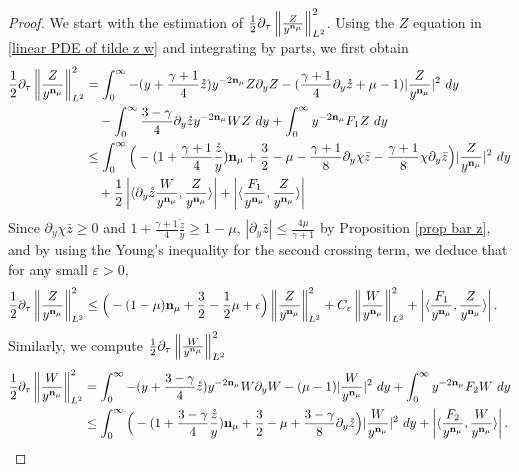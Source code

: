 \documentclass{article}
\newcommand{\norm}[1]{\left\lVert#1\right\rVert}
\newcommand{\ga}{\gamma}
\newcommand{\pa}{\partial}
\newcommand\eps{\varepsilon}
\def\espz{Z}
\def\espw{W}
\def\ndmu{{\bf{n}_{\mu}}}
\numberwithin{equation}{section}
\begin{document}
\begin{proof}
    We start with the estimation of $\frac12 \pa_\tau\norm{\frac{\espz }{y^{\ndmu}}}_{L^2}^2$. Using the $Z$ equation in \eqref{linear PDE of tilde z w} and integrating by parts, we first obtain 
	\begin{align*}
		\frac12 \pa_\tau\norm{\frac{\espz }{y^{\ndmu}}}_{L^2}^2 &= \int_0^\infty -(y+\frac{\ga+1}{4} \mathring z) y^{-2\ndmu}\espz \pa_y \espz -  (\frac{\ga+1}{4}\partial_y \mathring z +\mu-1)|\frac{\espz}{y^{\ndmu}}|^2 \ dy \\
        &\quad - \int_0^\infty   \frac{3-\ga}{4}\partial_y \mathring z {y^{-2\ndmu}}{\espw \espz}  \ dy
		+\int_0^\infty  
        y^{-2\ndmu}F_1 {\espz}{}  \ dy 
		 \\ &\leq   \int_0^\infty   \Big(-(1+\frac{\ga+1}{4}\frac{\mathring z}{y})\ndmu+\frac32-\mu-\frac{\ga+1}{8} \pa_y\chi \bar z-\frac{\ga+1}{8} \chi\pa_y \bar z \Big) |\frac{\espz}{y^{\ndmu}}|^2 \ dy \\
		 &\quad + \frac12 \left| \langle  \partial_y \mathring z \frac{\espw}{y^\ndmu}, \frac{\espz}{y^\ndmu} \rangle \right| + \left| \langle \frac{F_1}{y^\ndmu},\frac{\espz}{y^\ndmu} \rangle\right|   
         \end{align*}
      Since $\pa_y\chi \bar z\ge 0$ and $1+\frac{\ga+1}{4}\frac{\mathring z}{y} \ge 1- \mu $, $|\pa_y \bar z |\le \frac{4\mu}{\ga +1} $ by Proposition \ref{prop bar z}, and by using the Young's inequality for the second crossing term, we deduce that for any small $\eps>0$,   
         \begin{align*}
         \frac12 \pa_\tau\norm{\frac{\espz }{y^\ndmu}}_{L^2}^2  
		& \leq  \Big(-(1-\mu)\ndmu+\frac32-\frac{1}{2}\mu+\epsilon\Big) \norm{\frac{\espz}{y^{\ndmu}}}_{L^2}^2 +C_\eps \norm{\frac{\espw}{y^{\ndmu}}}_{L^2}^2 + \left| \langle \frac{F_1}{y^\ndmu},\frac{\espz}{y^\ndmu} \rangle\right| .  
	\end{align*} 
Similarly, we compute $\frac12 \pa_\tau\norm{\frac{\espw}{y^{\ndmu}}}_{L^2}^2 $
	\begin{align*}
		\frac12 \pa_\tau\norm{\frac{\espw}{y^{\ndmu}}}_{L^2}^2 &= \int_0^\infty -(y+\frac{3-\ga}{4}\mathring z )y^{-2\ndmu}\espw \pa_y \espw - (\mu-1)|\frac{\espw}{y^\ndmu}|^2\ dy+ \int_0^\infty   
        y^{-2\ndmu}F_2 {\espw}  \ dy \\
		&\leq \int_0^\infty\Big( -(1+\frac{3-\ga}{4}\frac{\mathring z}{y} )\ndmu +\frac{3}{2}-\mu+\frac{3-\ga}{8}\pa_y \mathring z \Big) |\frac{\espw}{y^\ndmu}|^2\ dy+\left| \langle \frac{F_2}{y^\ndmu},\frac{\espw}{y^\ndmu} \rangle\right|.

\end{align*}
\end{proof}
\end{document}
